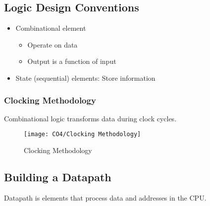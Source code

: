 \subsection{Logic Design Conventions}
\begin{itemize}
    \item Combinational element
    \begin{itemize}
        \item\small Operate on data
        \item\small Output is a function of input
    \end{itemize}
    \item State (sequential) elements: \small Store information
\end{itemize}



\subsubsection{Clocking Methodology}
Combinational logic transforms data during clock cycles. 

\begin{figure}[!htb]
    \centering
    \texttt{[image: CO4/Clocking Methodology]}
    \caption{Clocking Methodology}
\end{figure}

\subsection{Building a Datapath}
Datapath is elements that process data and addresses in the CPU. 


